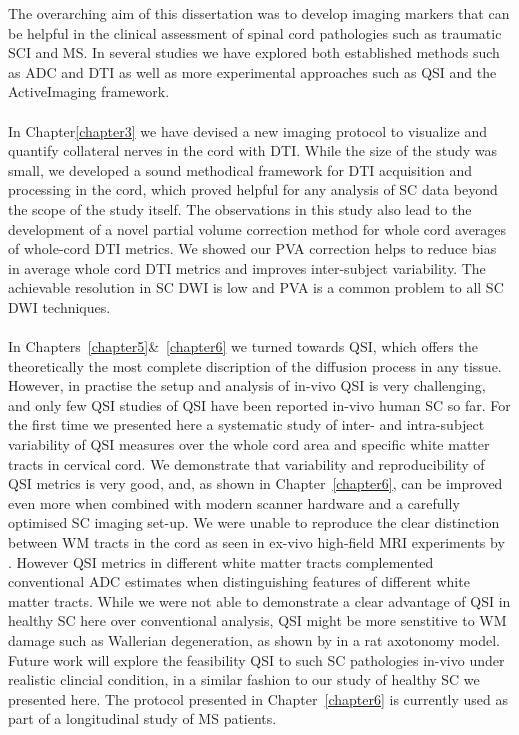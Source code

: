 The overarching aim of this dissertation was to develop imaging markers that can be helpful in the clinical assessment of spinal cord pathologies such as traumatic \gls{SCI} and \gls{MS}. In several studies we have explored both established methods such as \gls{ADC} and \gls{DTI} as well as more experimental approaches such as \gls{QSI} and the ActiveImaging framework.
\paragraph{}
In Chapter\ref{chapter3} we have devised a new imaging protocol to visualize and quantify collateral nerves in the cord with \gls{DTI}. While the size of the study was small, we developed a sound methodical framework for \gls{DTI} acquisition and processing in the cord, which proved helpful for any analysis of \gls{SC} data beyond the scope of the study itself. The observations in this study also lead to the development of a novel partial volume correction method for whole cord averages of whole-cord {\gls{DTI}} metrics. We showed our PVA correction helps to reduce bias in average whole cord \gls{DTI} metrics and improves inter-subject variability. The achievable resolution in {\gls{SC}} DWI is low and PVA is a common problem to all {\gls{SC}} DWI techniques. 
\paragraph{}
In Chapters~\ref{chapter5}\&~\ref{chapter6} we turned towards \gls{QSI}, which offers the theoretically the most complete discription of the diffusion process in any tissue. However, in practise the setup and analysis of in-vivo \gls{QSI} is very challenging, and only few \gls{QSI} studies of \gls{QSI} have been reported in-vivo human {\gls{SC}} so far. For the first time we presented here a systematic study of inter- and intra-subject variability of \gls{QSI} measures over the whole cord area and specific white matter tracts in cervical cord. We demonstrate that variability and reproducibility of \gls{QSI} metrics is very good, and, as shown in Chapter~\ref{chapter6}, can be improved even more when combined with modern scanner hardware and a carefully optimised \gls{SC} imaging set-up. We were unable to reproduce the clear distinction between WM tracts in the cord as seen in ex-vivo high-field MRI experiments by \citet{Ong:2012}. However \gls{QSI} metrics in different white matter tracts complemented conventional \gls{ADC} estimates when distinguishing features of different white matter tracts. While we were not able to demonstrate a clear advantage of \gls{QSI} in healthy SC here over conventional analysis, \gls{QSI} might be more senstitive to WM damage such as Wallerian degeneration, as shown by \citet{Farrell:2010} in a rat axotonomy model. Future work will explore the feasibility \gls{QSI} to such SC pathologies in-vivo under realistic clincial condition, in a similar fashion to our study of healthy SC we presented here. The protocol presented in Chapter~\ref{chapter6} is currently used as part of a longitudinal study of \gls{MS} patients.

